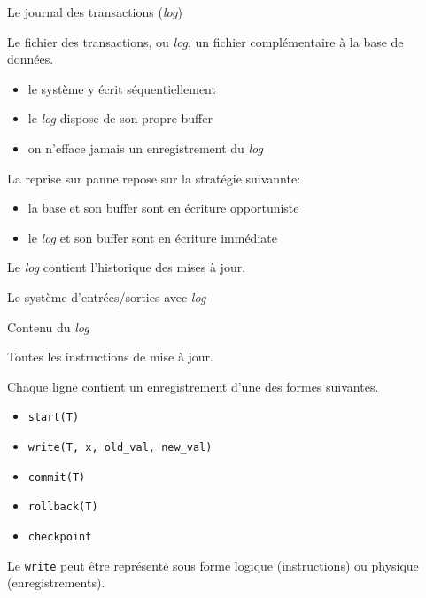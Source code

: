 \begin{frame}{Le journal des transactions (\textit{log})}

Le fichier
des transactions, ou \textit{log}, un fichier complémentaire à la base de données.

\vfill

\begin{itemize}
  \item le système y écrit \alert{séquentiellement}
  \item le \textit{log} dispose de son propre buffer  
    \item on n'efface \alert{jamais} un enregistrement du \textit{log}
\end{itemize}

\vfill

La reprise sur panne repose sur la stratégie suivannte:

\vfill

\begin{itemize}
  \item \alert{la base et son buffer}  sont  en écriture \alert{opportuniste}
  \item \alert{le \textit{log} et son buffer} sont  en écriture \alert{immédiate}
\end{itemize}

\vfill

\begin{block}{}
Le \textit{log} contient l'historique des
mises à jour.
\end{block}
\end{frame}


\begin{frame}{Le système d'entrées/sorties avec \textit{log}}




\end{frame}
 
 
 
\begin{frame}{Contenu du \textit{log}}

Toutes les instructions de mise à jour.

\vfill

Chaque ligne contient un enregistrement d'une des formes suivantes.

\begin{itemize}
  \item \texttt{start(T)}
  \item \texttt{write(T, x, old\_val, new\_val)}
  \item \texttt{commit(T)}
  \item \texttt{rollback(T)}
  \item \texttt{checkpoint}
\end{itemize}

\vfill

\begin{block}{}
Le \texttt{write} peut être
représenté sous forme \alert{logique}
(instructions) ou \alert{physique}
(enregistrements).
\end{block}
\end{frame}

